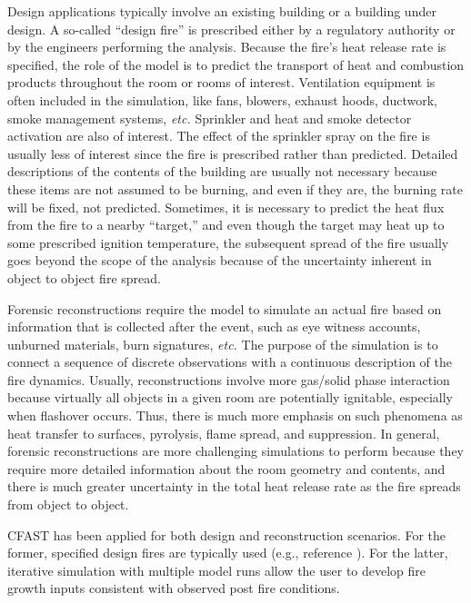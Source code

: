Design  applications  typically  involve  an existing  building  or  a building  under  design. A  so-called  ``design  fire'' is  prescribed either by  a regulatory authority  or by the engineers  performing the analysis. Because the  fire's heat release rate is  specified, the role of the model is to predict  the transport of heat and combustion products throughout  the room or  rooms of  interest. Ventilation  equipment is often included  in the simulation, like fans,  blowers, exhaust hoods, ductwork,  smoke management systems,  {\em etc.} Sprinkler  and heat and smoke detector activation are also of interest.  The effect of the sprinkler spray on the fire is usually less of interest since the fire is  prescribed rather  than  predicted. Detailed  descriptions of  the contents of the building are usually not necessary because these items are not assumed to be burning,  and even if they are, the burning rate will be  fixed, not predicted.  Sometimes, it is necessary  to predict the heat  flux from the fire  to a nearby ``target,''  and even though the target  may heat up  to some prescribed ignition  temperature, the subsequent spread  of the  fire usually goes  beyond the scope  of the analysis because of the uncertainty  inherent in object to object fire spread.

Forensic reconstructions require the  model to simulate an actual fire based on  information that is collected  after the event,  such as eye witness accounts, unburned materials,  burn signatures, {\em etc.} The purpose  of  the simulation  is  to  connect  a sequence  of  discrete observations  with  a continuous  description  of  the fire  dynamics. Usually,  reconstructions  involve  more gas/solid  phase  interaction because  virtually  all  objects  in  a  given  room  are  potentially ignitable, especially when flashover  occurs. Thus, there is much more emphasis on  such phenomena as  heat transfer to  surfaces, pyrolysis, flame  spread, and suppression.  In general,  forensic reconstructions are more challenging simulations  to perform because they require more detailed  information  about the  room  geometry and contents,  and  there is  much greater uncertainty in the total heat release rate as the fire spreads from object to object.

CFAST has been applied for both design and reconstruction scenarios. For the former, specified design fires are typically used (e.g., reference \cite{NRCNUREG6850}).  For the latter, iterative simulation with multiple model runs allow the user to develop fire growth inputs consistent with observed post fire conditions.




